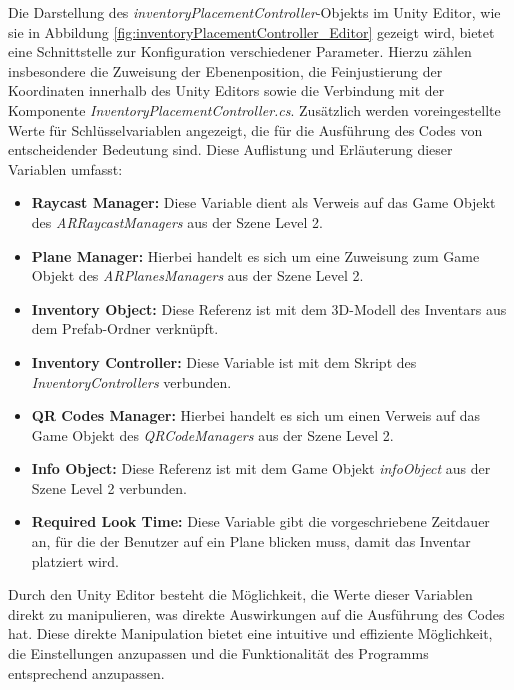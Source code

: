 Die Darstellung des \textit{inventoryPlacementController}-Objekts im Unity Editor, wie sie in Abbildung \ref{fig:inventoryPlacementController_Editor}
gezeigt wird, bietet eine Schnittstelle zur Konfiguration verschiedener Parameter. Hierzu zählen insbesondere die Zuweisung
der Ebenenposition, die Feinjustierung der Koordinaten innerhalb des Unity Editors sowie die Verbindung mit der Komponente
\textit{InventoryPlacementController.cs}. Zusätzlich werden voreingestellte Werte für Schlüsselvariablen angezeigt, die
für die Ausführung des Codes von entscheidender Bedeutung sind. Diese Auflistung und Erläuterung dieser Variablen umfasst:
\begin{itemize}
    \item \textbf{Raycast Manager:} Diese Variable dient als Verweis auf das Game Objekt des \textit{ARRaycastManagers}
    aus der Szene Level 2.
    \item \textbf{Plane Manager:} Hierbei handelt es sich um eine Zuweisung zum Game Objekt des \textit{ARPlanesManagers}
    aus der Szene Level 2.
    \item \textbf{Inventory Object:} Diese Referenz ist mit dem 3D-Modell des Inventars aus dem Prefab-Ordner verknüpft.
    \item \textbf{Inventory Controller:} Diese Variable ist mit dem Skript des \textit{InventoryControllers} verbunden.
    \item \textbf{QR Codes Manager:} Hierbei handelt es sich um einen Verweis auf das Game Objekt des \textit{QRCodeManagers}
    aus der Szene Level 2.
    \item \textbf{Info Object:} Diese Referenz ist mit dem Game Objekt \textit{infoObject} aus der Szene Level 2 verbunden.
    \item \textbf{Required Look Time:} Diese Variable gibt die vorgeschriebene Zeitdauer an, für die der Benutzer auf ein
    Plane blicken muss, damit das Inventar platziert wird.
\end{itemize}

Durch den Unity Editor besteht die Möglichkeit, die Werte dieser Variablen direkt zu manipulieren, was direkte Auswirkungen
auf die Ausführung des Codes hat. Diese direkte Manipulation bietet eine intuitive und effiziente Möglichkeit, die Einstellungen
anzupassen und die Funktionalität des Programms entsprechend anzupassen.

